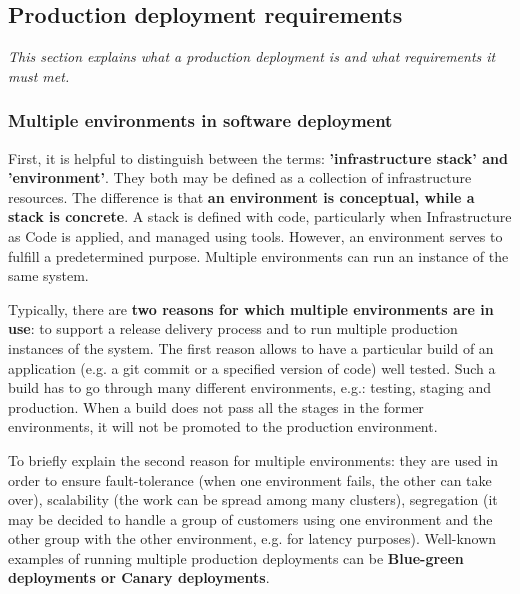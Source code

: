 \subsection{Production deployment requirements}
\label{2-prod-req}
\textit{This section explains what a production deployment is and what requirements it must met.}
~\\

\subsubsection{Multiple environments in software deployment}
First, it is helpful to distinguish between the terms: \textbf{'infrastructure stack' and 'environment'}. They both may be defined as a collection of infrastructure resources. The difference is that \textbf{an environment is conceptual, while a stack is concrete}. A stack is defined with code, particularly when Infrastructure as Code is applied, and managed using tools. However, an environment serves to fulfill a predetermined purpose. Multiple environments can run an instance of the same system\cite{book-iac}.

Typically, there are \textbf{two reasons for which multiple environments are in use}: to support a release delivery process and to run multiple production instances of the system. The first reason allows to have a particular build of an application (e.g. a git commit or a specified version of code) well tested. Such a build has to go through many different environments, e.g.: testing, staging and production. When a build does not pass all the stages in the former environments, it will not be promoted to the production environment\cite{book-iac}\cite{book-cicd}.

To briefly explain the second reason for multiple environments: they are used in order to ensure fault-tolerance (when one environment fails, the other can take over), scalability (the work can be spread among many clusters), segregation (it may be decided to handle a group of customers using one environment and the other group with the other environment, e.g. for latency purposes)\cite{book-iac}. Well-known examples of running multiple production deployments can be \textbf{Blue-green deployments or Canary deployments}\cite{bachelor-ha}.


